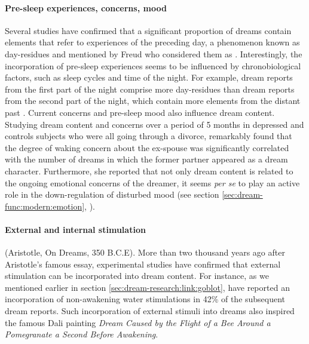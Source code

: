 \paragraph{Pre-sleep experiences, concerns, mood}

Several studies \citep{botman_dream_1990, nielsen_day-residue_1992, marquardt_empirical_1996} have confirmed that a significant proportion of dreams contain elements that refer to experiences of the preceding day, a phenomenon known as day-residues and mentioned by Freud who considered them as  \citep{freud_interpretation_1900}. Interestingly, the incorporation of pre-sleep experiences seems to be influenced by chronobiological factors, such as sleep cycles and time of the night. For example, dream reports from the first part of the night comprise more day-residues than dream reports from the second part of the night, which contain more elements from the distant past \citep{roffwarg_effects_1978}.
Current concerns and pre-sleep mood also influence dream content. Studying dream content and concerns over a period of 5 months in depressed and controls subjects who were all going through a divorce, \citet{cartwright_relation_2006} remarkably found that the degree of waking concern about the ex-spouse was significantly correlated with the number of dreams in which the former partner appeared as a dream character. Furthermore, she reported that not only dream content is related to the ongoing emotional concerns of the dreamer, it seems \emph{per se} to play an active role in the down-regulation of disturbed mood (see section \ref{sec:dream-func:modern:emotion}, \citealp{cartwright_dreams_1991, cartwright_role_1998, cartwright_role_1998, cartwright_relation_2006}).

\paragraph{External and internal stimulation}

 (Aristotle, On Dreams, 350 B.C.E). More than two thousand years ago after Aristotle's famous essay, experimental studies have confirmed that external stimulation can be incorporated into dream content. For instance, as we mentioned earlier in section \ref{sec:dream-research:link:goblot}, \citet{dement_relation_1958} have reported an incorporation of non-awakening water stimulations in 42\% of the subsequent dream reports. Such incorporation of external stimuli into dreams also inspired the famous Dali painting \emph{Dream Caused by the Flight of a Bee Around a Pomegranate a Second Before Awakening}.
